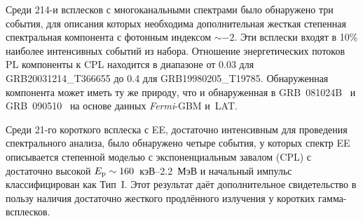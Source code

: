 \begin{enumerate}
    Среди 214-и всплесков с многоканальными спектрами было обнаружено три
    события, для описания которых необходима дополнительная жесткая степенная 
    спектральная компонента с фотонным индексом $\sim -2$. Эти всплески входят в 10\%
    наиболее интенсивных событий из набора. Отношение энергетических потоков PL
    компоненты к CPL находится в диапазоне от 0.03 для GRB20031214\_T366655 до
    0.4 для GRB19980205\_T19785. Обнаруженная компонента может иметь ту же природу,
    что и обнаруженная в GRB~081024B~\citep{Abdo_2010ApJ_712_558A} и 
    GRB~090510~\citep{Ackermann_2010ApJ_716_1178A} на основе данных \textit{Fermi}-GBM и~LAT.
    
    Среди 21-го короткого всплеска с EE, достаточно интенсивным 
    для проведения спектрального анализа, было обнаружено четыре события, у которых 
    спектр EE описывается степенной моделью с экспоненциальным завалом (CPL) 
    с достаточно высокой $E_{\mathrm{p}} \sim 160$~кэВ--2.2~МэВ и начальный импульс 
    классифицирован как Тип~I. Этот результат даёт дополнительное свидетельство 
    в пользу наличия достаточно жесткого продлённого излучения у коротких гамма-всплесков. 
  
\end{enumerate}


\clearpage